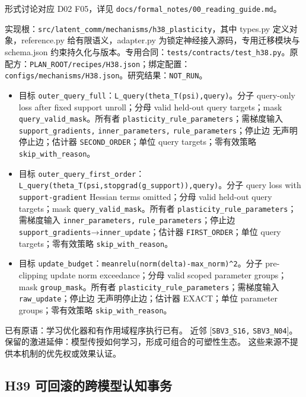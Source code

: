 \documentclass[
  10pt,
]{article}
\begin{document}
形式讨论对应 D02 F05，详见
{\small\nolinkurl{docs/formal_notes/00_reading_guide.md}}。

实现根：{\small\nolinkurl{src/latent_comm/mechanisms/h38_plasticity}}，其中
types.py 定义对象，reference.py 给有限语义，adapter.py
为锁定神经接入源码，专用迁移模块与 schema.json
约束持久化与版本。专用合同：{\small\nolinkurl{tests/contracts/test_h38.py}}。原配方：{\small\nolinkurl{PLAN_ROOT/recipes/H38.json}}；绑定配置：{\small\nolinkurl{configs/mechanisms/H38.json}}。研究结果：\nolinkurl{NOT_RUN}。

\begin{itemize}
\item
  目标
  \nolinkurl{outer_query_full}：{\small\nolinkurl{L_query(theta_T(psi),query)}}。分子
  query-only loss after fixed support unroll；分母 valid held-out query
  targets；mask \nolinkurl{query_valid_mask}。所有者
  \nolinkurl{plasticity_rule_parameters}；需梯度输入
  \nolinkurl{support_gradients,} \nolinkurl{inner_parameters,}
  \nolinkurl{rule_parameters}；停止边 无声明停止边；估计器
  \nolinkurl{SECOND_ORDER}；单位 query targets；零有效策略
  \nolinkurl{skip_with_reason}。
\item
  目标
  \nolinkurl{outer_query_first_order}：{\small\nolinkurl{L_query(theta_T(psi,stopgrad(g_support)),query)}}。分子
  query loss with \nolinkurl{support-gradient} Hessian terms
  omitted；分母 valid held-out query targets；mask
  \nolinkurl{query_valid_mask}。所有者
  \nolinkurl{plasticity_rule_parameters}；需梯度输入
  \nolinkurl{inner_parameters,} \nolinkurl{rule_parameters}；停止边
  \nolinkurl{support_gradients}→\nolinkurl{inner_update}；估计器
  \nolinkurl{FIRST_ORDER}；单位 query targets；零有效策略
  \nolinkurl{skip_with_reason}。
\item
  目标
  \nolinkurl{update_budget}：{\small\nolinkurl{mean}\hspace{0.333em}\nolinkurl{relu(norm(delta)-max_norm)^2}}。分子
  pre-clipping update norm exceedance；分母 valid scoped parameter
  groups；mask \nolinkurl{group_mask}。所有者
  \nolinkurl{plasticity_rule_parameters}；需梯度输入
  \nolinkurl{raw_update}；停止边 无声明停止边；估计器 EXACT；单位
  parameter groups；零有效策略 \nolinkurl{skip_with_reason}。
\end{itemize}

已有原语：学习优化器和有作用域程序执行已有。 近邻
{[}\nolinkurl{SBV3_S16,}
\nolinkurl{SBV3_N04}{]}。保留的激进延伸：模型传授如何学习，形成可组合的可塑性生态。
这些来源不提供本机制的优先权或效果认证。

\subsection{H39
可回滚的跨模型认知事务}\label{h39-ux53efux56deux6edaux7684ux8de8ux6a21ux578bux8ba4ux77e5ux4e8bux52a1}
\end{document}

